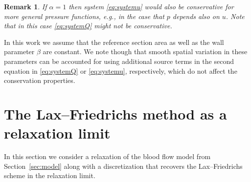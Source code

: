 \documentclass[a4paper,11pt]{article}
\newtheorem{remark}[theorem]{Remark}
\begin{document}
    \begin{remark}
      If $\alpha=1$ then system \eqref{eq:systemu} would also be conservative for more general pressure functions, e.g., in the case that $p$ depends also on $u$. Note that in this case \eqref{eq:systemQ} might not be conservative.
    \end{remark}
    In this work we assume that the reference section area as well as the wall parameter $\beta$ are constant. We note though that smooth spatial variation in these parameters can be accounted for using additional source terms in the second equation in \eqref{eq:systemQ} or \eqref{eq:systemu}, respectively, which do not affect the conservation properties.

\section{The Lax--Friedrichs method as a relaxation limit}\label{sec: LF}
In this section we consider a relaxation of the blood flow model from Section~\ref{sec:model} along with a discretization that recovers the Lax--Friedrichs scheme in the relaxation limit.
\end{document}
